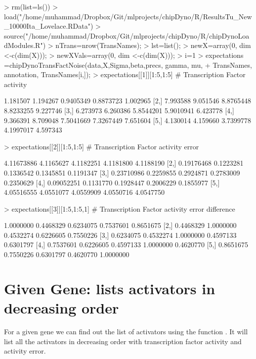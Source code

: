 \documentclass{article}
\begin{document}
\begin{Schunk}
\begin{Sinput}
> rm(list=ls())
> load("/home/muhammad/Dropbox/Git/mlprojects/chipDyno/R/ResultsTu_New_10000Ita_Lovelace.RData")
> source("/home/muhammad/Dropbox/Git/mlprojects/chipDyno/R/chipDynoLoadModules.R")
> nTrans=nrow(TransNames);
> lst=list();
> newX=array(0, dim <-c(dim(X)));
> newXVals=array(0, dim <-c(dim(X)));
> i=1
> expectations =chipDynoTransFactNoise(data,X,Sigma,beta,precs, gamma, mu, 
+   					TransNames, annotation, TransNames[i,]);
> expectations[[1]][1:5,1:5] # Transcription Factor activity
\end{Sinput}
\begin{Soutput}
         [,1]     [,2]      [,3]      [,4]     [,5]
[1,] 1.181507 1.194267 0.9405349 0.8873723 1.002965
[2,] 7.993588 9.051546 8.8765448 8.8233255 9.227746
[3,] 6.273973 6.260386 5.8544201 5.9010941 6.423778
[4,] 9.366391 8.709048 7.5041669 7.3267449 7.651604
[5,] 4.130014 4.159660 3.7399778 4.1997017 4.597343
\end{Soutput}
\begin{Sinput}
> expectations[[2]][1:5,1:5] # Transcription Factor activity error
\end{Sinput}
\begin{Soutput}
           [,1]      [,2]      [,3]      [,4]      [,5]
[1,] 4.11673886 4.1165627 4.1182251 4.1181800 4.1188190
[2,] 0.19176468 0.1223281 0.1336542 0.1345851 0.1191347
[3,] 0.23710986 0.2259855 0.2924871 0.2783009 0.2350629
[4,] 0.09052251 0.1131770 0.1928447 0.2006229 0.1855977
[5,] 4.05516555 4.0551077 4.0559909 4.0550716 4.0547750
\end{Soutput}
\begin{Sinput}
> expectations[[3]][1:5,1:5,1] # Transcription Factor activity error difference
\end{Sinput}
\begin{Soutput}
          [,1]      [,2]      [,3]      [,4]      [,5]
[1,] 1.0000000 0.4468329 0.6234075 0.7537601 0.8651675
[2,] 0.4468329 1.0000000 0.4532274 0.6226605 0.7550226
[3,] 0.6234075 0.4532274 1.0000000 0.4597133 0.6301797
[4,] 0.7537601 0.6226605 0.4597133 1.0000000 0.4620770
[5,] 0.8651675 0.7550226 0.6301797 0.4620770 1.0000000
\end{Soutput}
\end{Schunk}


\section{Given Gene: lists activators in decreasing order}
For a given gene we can find out the list of activators using the function . It will list all the activators in decreasing order with transcription factor activity and activity error.
\end{document}

